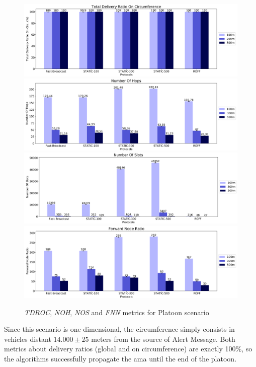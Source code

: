 		\begin{figure}[H]
			\centering
			\includegraphics[width=1.1\textwidth]{immagini/platoon-15km/tdroc}
			\includegraphics[width=1.1\textwidth]{immagini/platoon-15km/noh}
			\includegraphics[width=1.1\textwidth]{immagini/platoon-15km/nos}
			\includegraphics[width=1.1\textwidth]{immagini/platoon-15km/fnn}
			\caption{\textit{TDROC}, \textit{NOH}, \textit{NOS} and \textit{FNN} metrics for Platoon scenario}
			\label{fig:metric-platoon-15km-1}
		\end{figure}
	
		\newpage
	
		Since this scenario is one-dimensional, the circumference simply consists in vehicles distant $14.000  \pm 25$ meters from the source of Alert Message. Both metrics about delivery ratios (global and on circumference) are exactly 100\%, so the algorithms successfully propagate the \acrshort{ama} until the end of the platoon.
		
